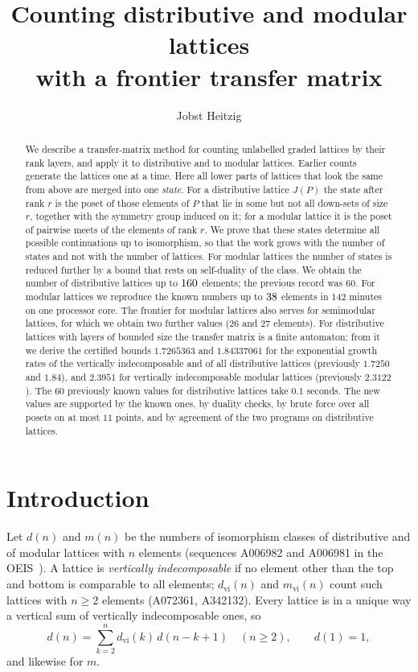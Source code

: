 \documentclass[11pt]{amsart}
\title[Counting distributive and modular lattices]{Counting distributive and modular lattices\\ with a frontier transfer matrix}
\author{Jobst Heitzig}
\theoremstyle{definition}
\theoremstyle{remark}
\begin{document}
\begin{abstract}
We describe a transfer-matrix method for counting unlabelled graded lattices by
their rank layers, and apply it to distributive and to modular lattices.  Earlier
counts generate the lattices one at a time.  Here all lower parts of lattices
that look the same from above are merged into one \emph{state}.  For a
distributive lattice $J(P)$ the state after rank $r$ is the poset of those elements of
$P$ that lie in some but not all down-sets of size $r$, together with the
symmetry group induced on it; for a modular lattice it is the poset of pairwise
meets of the elements of rank $r$.  We prove that these states determine all
possible continuations up to isomorphism, so that the work grows with the number
of states and not with the number of lattices.  For modular lattices the number
of states is reduced further by a bound that rests on self-duality of the class.
We obtain the number of distributive lattices up to $160$ elements; the previous record
was $60$.  For modular lattices we reproduce the known numbers up to $38$ elements in
$142$ minutes on one processor core.
The frontier for modular lattices also serves for semimodular lattices, for which we
obtain two further values ($26$ and $27$ elements).
For distributive lattices with layers of bounded size the transfer matrix is a finite
automaton; from it we derive the certified bounds $1.7265363$ and $1.84337061$ for the
exponential growth rates of the vertically indecomposable and of all distributive lattices
(previously $1.7250$ and $1.84$), and $2.3951$ for vertically indecomposable modular
lattices (previously $2.3122$).
The $60$ previously known values for distributive lattices take $0.1$ seconds.  The
new values are supported by the known ones, by duality checks, by brute force
over all posets on at most $11$ points, and by agreement of the two programs on
distributive lattices.
\end{abstract}

\maketitle

\section{Introduction}

Let $d(n)$ and $m(n)$ be the numbers of isomorphism classes of distributive and of
modular lattices with $n$ elements (sequences A006982 and A006981 in the
OEIS~\cite{oeis}).  A lattice is \emph{vertically indecomposable} if no element other
than the top and bottom is comparable to all elements; $d_{\mathrm{vi}}(n)$ and
$m_{\mathrm{vi}}(n)$ count such lattices with $n \ge 2$ elements (A072361, A342132).
Every lattice is in a unique way a vertical sum of vertically indecomposable ones, so
\begin{equation}\label{eq:vsum}
  d(n) = \sum_{k=2}^{n} d_{\mathrm{vi}}(k)\, d(n-k+1) \quad (n \ge 2), \qquad d(1)=1,
\end{equation}
and likewise for $m$.
\end{document}
